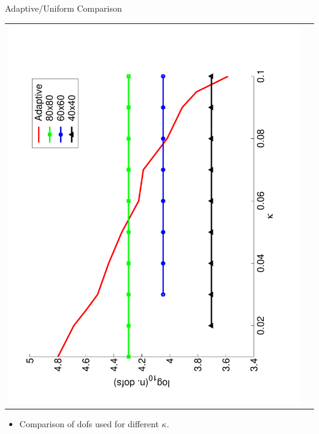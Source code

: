 \documentclass[compress,12pt]{beamer}
\begin{document}
\begin{frame}{Adaptive/Uniform Comparison}
  \begin{center}
    \begin{tabular}{cc} \\
      \includegraphics[angle=-90,width=.75\textwidth]{figures/dofs_vs_kappa}
    \end{tabular}
  \end{center}

  \begin{itemize}
  \item Comparison of dofs used for different $\kappa$.
  \end{itemize}
\end{frame}
\end{document}
